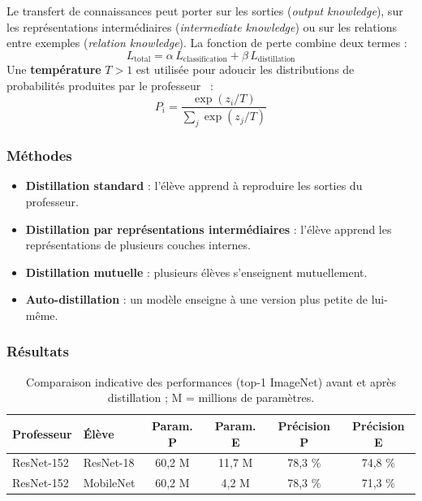 Le transfert de connaissances peut porter sur les sorties (\emph{output
knowledge}), sur les représentations intermédiaires (\emph{intermediate
knowledge}) ou sur les relations entre exemples (\emph{relation knowledge}).
La fonction de perte combine deux termes :
\begin{equation}
  L_{\text{total}} = \alpha \, L_{\text{classification}} + \beta \, L_{\text{distillation}}
\end{equation}
Une \textbf{température} $T > 1$ est utilisée pour adoucir les distributions de
probabilités produites par le professeur~\cite{hinton2015distilling} :
\begin{equation}
  P_i = \frac{\exp(z_i / T)}{\sum_j \exp(z_j / T)}
\end{equation}

\subsubsection{Méthodes}
\begin{itemize}
  \item \textbf{Distillation standard} : l'élève apprend à reproduire les sorties du professeur.
  \item \textbf{Distillation par représentations intermédiaires} : l'élève apprend les représentations de plusieurs couches internes.
  \item \textbf{Distillation mutuelle} : plusieurs élèves s'enseignent mutuellement.
  \item \textbf{Auto-distillation} : un modèle enseigne à une version plus petite de lui-même.
\end{itemize}

\subsubsection{Résultats}

\begin{table}[H]
\centering
\small
\begin{tabular}{llcccc}
\toprule
Professeur & Élève & Param. P & Param. E & Précision P & Précision E \\
\midrule
ResNet-152 & ResNet-18 & 60,2 M & 11,7 M & 78,3 \% & 74,8 \% \\
ResNet-152 & MobileNet & 60,2 M & 4,2 M  & 78,3 \% & 71,3 \% \\
\bottomrule
\end{tabular}
\caption{Comparaison indicative des performances (top-1 ImageNet) avant et après distillation ; M = millions de paramètres.}
\label{tab:distillation}
\end{table}


